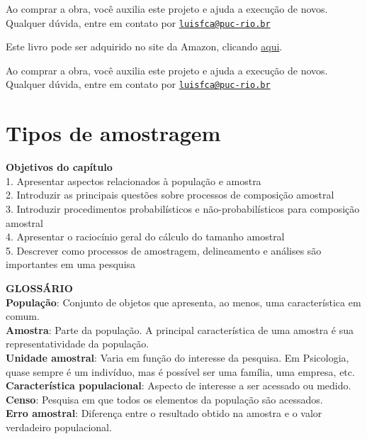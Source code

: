 \documentclass[
]{book}
\newenvironment{objectives}{
  \definecolor{shadecolor}{rgb}{0, 0, 0}  %
  \color{white}
  \begin{shaded}}
 {\end{shaded}}
\begin{document}
Ao comprar a obra, você auxilia este projeto e ajuda a execução de novos. Qualquer dúvida, entre em contato por \href{mailto:luisfca@puc-rio.br}{\nolinkurl{luisfca@puc-rio.br}}

Este livro pode ser adquirido no site da Amazon, clicando \href{https://www.amazon.com.br/gp/product/B097CP7T9M?pf_rd_r=RDZC8XYMBC1WY69T0J8K\&pf_rd_p=abb22e6b-8812-4b76-a424-5f0b098d2c90\&pd_rd_r=ceec1911-f409-4acd-ac8f-2d5bc68dac43\&pd_rd_w=wMUzJ\&pd_rd_wg=ZK85a\&ref_=pd_gw_unk}{aqui}.

Ao comprar a obra, você auxilia este projeto e ajuda a execução de novos. Qualquer dúvida, entre em contato por \href{mailto:luisfca@puc-rio.br}{\nolinkurl{luisfca@puc-rio.br}}

\hypertarget{tipos-de-amostragem}{%
\chapter{Tipos de amostragem}\label{tipos-de-amostragem}}

\begin{objectives}
\textbf{Objetivos do capítulo}\\
1. Apresentar aspectos relacionados à população e amostra\\
2. Introduzir as principais questões sobre processos de composição amostral\\
3. Introduzir procedimentos probabilísticos e não-probabilísticos para composição amostral\\
4. Apresentar o raciocínio geral do cálculo do tamanho amostral\\
5. Descrever como processos de amostragem, delineamento e análises são importantes em uma pesquisa

\end{objectives}

\textbf{GLOSSÁRIO}\\
\textbf{População}: Conjunto de objetos que apresenta, ao menos, uma característica em comum.\\
\textbf{Amostra}: Parte da população. A principal característica de uma amostra é sua representatividade da população.\\
\textbf{Unidade amostral}: Varia em função do interesse da pesquisa. Em Psicologia, quase sempre é um indivíduo, mas é possível ser uma família, uma empresa, etc.\\
\textbf{Característica populacional}: Aspecto de interesse a ser acessado ou medido.\\
\textbf{Censo}: Pesquisa em que todos os elementos da população são acessados.\\
\textbf{Erro amostral}: Diferença entre o resultado obtido na amostra e o valor verdadeiro populacional.
\end{document}
